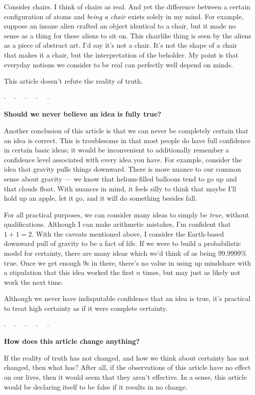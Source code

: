 \documentclass[11pt, oneside]{article}
\theoremstyle{argtstyle}
\newcommand{\dotq}{\cdot\quad}
\newcommand{\scenebreak}{
    \medskip\centerline{$\dotq\dotq\dotq\dotq\cdot$}\medskip
}
\begin{document}
Consider chairs. I think of chairs as real. And yet the difference between a
certain configuration of atoms and {\em being a chair} exists solely in my mind.
For example, suppose an insane alien crafted an object identical to a chair,
but it made no sense as a thing for these aliens to sit on.
This chairlike thing
is seen by the aliens as a piece of abstract art.
I'd say it's not a chair.
It's not the shape of a
chair that makes it a chair, but the interpretation of the beholder.
My point is that everyday notions we consider to be real can perfectly well
depend on minds.

This article doesn't refute the reality of truth.

\scenebreak

\noindent
{\bf Should we never believe an idea is fully true?}

Another conclusion of this article is that we can never be completely certain
that an idea is correct.
This is troublesome in that most people do have full confidence in certain
basic
ideas; it would be inconvenient to additionally remember a confidence level
associated with every idea you have.
For example, consider the idea that gravity pulls things downward.
There is more nuance to our common sense about gravity --- we know that
helium-filled balloons tend to go up and that clouds float.
With nuances in mind, it feels silly to think that maybe I'll hold up an
apple, let it go, and it will do something besides fall.

For all practical purposes, we can consider many ideas to simply be {\em true},
without qualifications. Although I can make arithmetic mistakes, I'm confident
that $1+1=2$. With the caveats mentioned above, I consider the Earth-based
downward pull of gravity to be a fact of life. If we were to build a
probabilistic model for certainty, there are many ideas which we'd think of as
being 99.9999\% true. Once we get enough 9s in there,
there's no value in using up mindshare with a stipulation that this idea worked
the first $n$ times, but may just as likely not work the next time.

Although we never have indisputable confidence that an idea is true,
it's practical to treat high certainty as if it were complete certainty.

\scenebreak

\noindent
{\bf How does this article change anything?}

If the reality of truth has not changed, and how we think about certainty has
not changed, then what has? After all, if the observations of this
article have no effect on our lives, then it would seem that they aren't
effective. In a sense, this article would be declaring itself to be false if
it results in no change.
\end{document}
